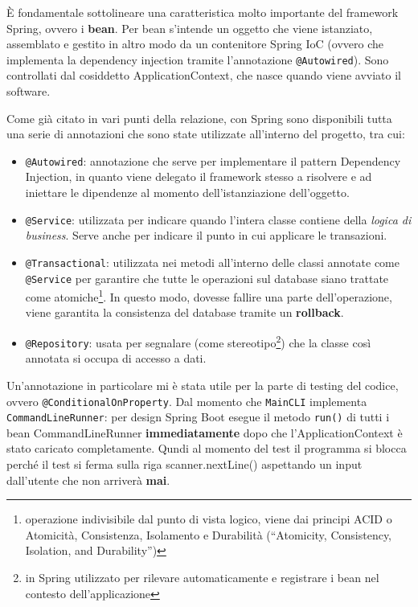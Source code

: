 \documentclass[
  italian,
  paper=a4,
  ,captions=tableheading
]{scrbook}
\newcommand{\passthrough}[1]{#1}
\providecommand{\tightlist}{%
  \setlength{\itemsep}{0pt}\setlength{\parskip}{0pt}}
\renewenvironment{quote}{\begin{customblockquote}\list{}{\rightmargin=0em\leftmargin=0em}%
\item\relax\color{blockquote-text}\ignorespaces}{\unskip\unskip\endlist\end{customblockquote}}
\begin{document}
\begin{quote}
È fondamentale sottolineare una caratteristica molto importante del
framework Spring, ovvero i \textbf{bean}. Per bean s'intende un oggetto
che viene istanziato, assemblato e gestito in altro modo da un
contenitore Spring IoC (ovvero che implementa la dependency injection
tramite l'annotazione \passthrough{\lstinline!@Autowired!}). Sono
controllati dal cosiddetto ApplicationContext, che nasce quando viene
avviato il software.
\end{quote}

Come già citato in vari punti della relazione, con Spring sono
disponibili tutta una serie di annotazioni che sono state utilizzate
all'interno del progetto, tra cui:

\begin{itemize}
\tightlist
\item
  \passthrough{\lstinline!@Autowired!}: annotazione che serve per
  implementare il pattern Dependency Injection, in quanto viene delegato
  il framework stesso a risolvere e ad iniettare le dipendenze al
  momento dell'istanziazione dell'oggetto.
\item
  \passthrough{\lstinline!@Service!}: utilizzata per indicare quando
  l'intera classe contiene della \emph{logica di business}. Serve anche
  per indicare il punto in cui applicare le transazioni.
\item
  \passthrough{\lstinline!@Transactional!}: utilizzata nei metodi
  all'interno delle classi annotate come
  \passthrough{\lstinline!@Service!} per garantire che tutte le
  operazioni sul database siano trattate come
  atomiche\footnote{operazione indivisibile dal punto di vista logico, viene dai principi ACID o Atomicità, Consistenza, Isolamento e Durabilità (“Atomicity, Consistency, Isolation, and Durability”)}.
  In questo modo, dovesse fallire una parte dell'operazione, viene
  garantita la consistenza del database tramite un \textbf{rollback}.
\item
  \passthrough{\lstinline!@Repository!}: usata per segnalare (come
  stereotipo\footnote{in Spring utilizzato per rilevare automaticamente e registrare i bean nel contesto dell’applicazione})
  che la classe così annotata si occupa di accesso a dati.
\end{itemize}

Un'annotazione in particolare mi è stata utile per la parte di testing
del codice, ovvero \passthrough{\lstinline!@ConditionalOnProperty!}. Dal
momento che \passthrough{\lstinline!MainCLI!} implementa
\passthrough{\lstinline!CommandLineRunner!}: per design Spring Boot
esegue il metodo \passthrough{\lstinline!run()!} di tutti i bean
CommandLineRunner \textbf{immediatamente} dopo che l'ApplicationContext
è stato caricato completamente. Qundi al momento del test il programma
si blocca perché il test si ferma sulla riga scanner.nextLine()
aspettando un input dall'utente che non arriverà \textbf{mai}.
\end{document}
